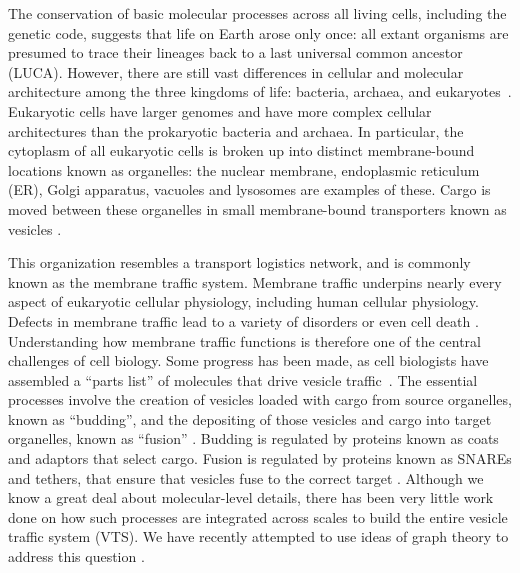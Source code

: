 

The conservation of basic molecular processes across all living cells,
including the genetic code, suggests that life on Earth arose only
once: all extant organisms are presumed to trace their lineages back
to a last universal common ancestor (LUCA).
%
However, there are still vast differences in cellular and molecular
architecture among the three kingdoms of life: bacteria, archaea, and
eukaryotes~\cite{embley2006eukaryotic}.
%
Eukaryotic cells have larger genomes and have more complex cellular
architectures than the prokaryotic bacteria and archaea.
%
In particular, the cytoplasm of all eukaryotic cells is broken up into
distinct membrane-bound locations known as organelles: the nuclear
membrane, endoplasmic reticulum (ER), Golgi apparatus, vacuoles and
lysosomes are examples of these.
%
Cargo is moved between these organelles in small membrane-bound
transporters known as vesicles \cite{stenmark2009rab}.

This organization resembles a transport logistics network, and is
commonly known as the membrane traffic system.
%
Membrane traffic underpins nearly every aspect of eukaryotic cellular
physiology, including human cellular physiology.
%
Defects in membrane traffic lead to a variety of disorders or even
cell death \cite{stenmark2009rab}.
%
Understanding how membrane traffic functions is therefore one of the
central challenges of cell biology.
%
Some progress has been made, as cell biologists have assembled a
“parts list” of molecules that drive vesicle
traffic~\cite{dacks2007evolution}.
%
The essential processes involve the creation of vesicles loaded with
cargo from source organelles, known as “budding”, and the depositing
of those vesicles and cargo into target organelles, known as “fusion”
\cite{munro2004organelle}.
%
Budding is regulated by proteins known as coats and adaptors that
select cargo.
%
Fusion is regulated by proteins known as SNAREs and tethers, that
ensure that vesicles fuse to the correct target
\cite{mani2016stacking}.
%
Although we know a great deal about molecular-level details, there has
been very little work done on how such processes are integrated across
scales to build the entire vesicle traffic system (VTS).
%
We have recently attempted to use ideas of graph theory to address
this question \cite{mani2016stacking,shukla}.

